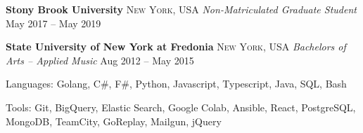\documentclass[10pt,letterpaper]{article}
\begin{document}

\headedsection
{\textbf{Stony Brook University}}
{\textsc{New York, USA}} {
	\headedsubsection
	{\textit{Non-Matriculated Graduate Student}}
	{May 2017 -- May 2019}
	{\bodytext{}}
}
\vspace{-5mm}


\headedsection
{\textbf{State University of New York at Fredonia}}
{\textsc{New York, USA}} {
	\headedsubsection
	{\textit{Bachelors of Arts -- Applied Music}}
	{Aug 2012 -- May 2015}
	{\bodytext{}}
}
\vspace{-5mm}


\spacedhrule{0.6em}{-0.7em}








\inlineheadsection
{Languages:}
{Golang, C\#, F\#, Python, Javascript, Typescript, Java, SQL, Bash}
\vspace{.5em}


\inlineheadsection
{Tools:}
{Git, BigQuery, Elastic Search, Google Colab, Ansible, React, PostgreSQL, MongoDB, TeamCity, GoReplay, Mailgun, jQuery}
\vspace{0.5em}


\spacedhrule{1em}{-1em}






\end{document}
